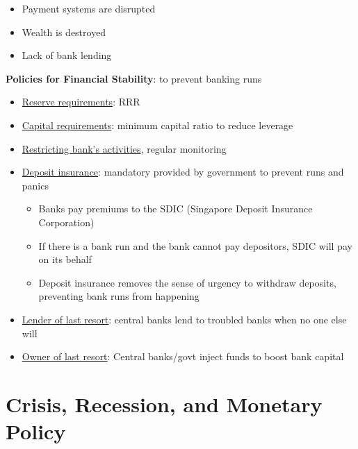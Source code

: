 \documentclass{article}
\begin{document}
\begin{multicols}{2}
\begin{itemize}
	\begin{itemize}
		\item Payment systems are disrupted
		\item Wealth is destroyed
		\item Lack of bank lending
	\end{itemize}
\end{itemize}
\textbf{Policies for Financial Stability}: to prevent banking runs
\begin{itemize}
	\item \underline{Reserve requirements}: RRR
	\item \underline{Capital requirements}: minimum capital ratio to reduce leverage
	\item \underline{Restricting bank's activities}, regular monitoring
	\item \underline{Deposit insurance}: mandatory provided by government to prevent runs and panics
	\begin{itemize}
		\item Banks pay premiums to the SDIC (Singapore Deposit Insurance Corporation)
		\item If there is a bank run and the bank cannot pay depositors, SDIC will pay on its behalf
		\item Deposit insurance removes the sense of urgency to withdraw deposits, preventing bank runs from happening
	\end{itemize}
    \item \underline{Lender of last resort}: central banks lend to troubled banks when no one else will
    \item \underline{Owner of last resort}: Central banks/govt inject funds to boost bank capital
\end{itemize}

\section{Crisis, Recession, and Monetary Policy}

\end{multicols}
\end{document}
